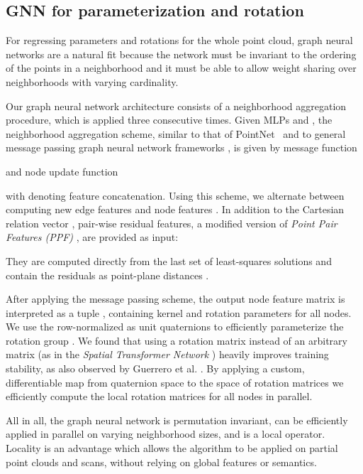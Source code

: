 \documentclass[10pt,twocolumn,letterpaper]{article}
\begin{document}
\subsection{GNN for parameterization and rotation}\label{sec:deepw}
For regressing parameters  and rotations  for the whole point cloud, graph neural networks \cite{Fey:2019, Hamilton:2017} are a natural fit because the network must be invariant to the ordering of the points in a neighborhood and it must be able to allow weight sharing over neighborhoods with varying cardinality.

Our graph neural network architecture consists of a neighborhood aggregation procedure, which is applied three consecutive times. Given MLPs  and , the neighborhood aggregation scheme, similar to that of \mbox{PointNet \cite{Qi:2017}} and to general message passing graph neural network frameworks \cite{Hamilton:2017, Morris:2019}, is given by message function

 and node update function

 with  denoting feature concatenation. Using this scheme, we alternate between computing new edge features  and node features . 
 In addition to the Cartesian relation vector \mbox{}, pair-wise residual features, a modified version of \emph{Point Pair Features (PPF)} \cite{Deng:2018b, Deng:2018a}, are provided as input:

They are computed directly from the last set of least-squares solutions and contain the residuals as point-plane distances . 

After applying the message passing scheme, the output node feature matrix  is interpreted as a tuple , containing kernel and rotation parameters for all nodes. We use the row-normalized  as unit quaternions to efficiently parameterize the rotation group . We found that using a rotation matrix instead of an arbitrary  matrix (as in the \emph{Spatial Transformer Network} \cite{Jaderberg:2015}) heavily improves training stability, as also observed by Guerrero et al. \cite{Guerrero:2018}. By applying a custom, differentiable map from quaternion space to the space of rotation matrices we efficiently compute the local rotation matrices  for all nodes in parallel.

All in all, the graph neural network is permutation invariant, can be efficiently applied in parallel on varying neighborhood sizes, and is a local operator. Locality is an advantage which allows the algorithm to be applied on partial point clouds and scans, without relying on global features or semantics. 
\end{document}
